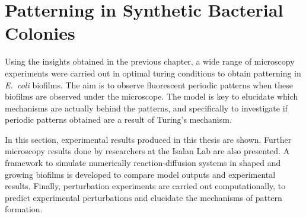 \chapter{Patterning in Synthetic Bacterial Colonies} \label{chapter3}
%

Using the insights obtained in the previous chapter, a wide range of microscopy experiments were carried out in optimal turing conditions to obtain patterning in \textit{E.~coli} biofilms.
The aim is to observe fluorescent periodic patterns when these biofilms are observed under the microscope.
The model is key to elucidate which mechanisms are actually behind the patterns, and specifically to investigate if periodic patterns obtained are a result of Turing's mechanism.

In this section, experimental results produced in this thesis are shown.
Further microscopy results done by researchers at the Isalan Lab are also presented.
A framework to simulate numerically reaction-diffusion systems in shaped and growing biofilms is developed to compare model outputs and experimental results.
Finally, perturbation experiments are carried out computationally, to predict experimental perturbations and elucidate the mechanisms of pattern formation.


%

